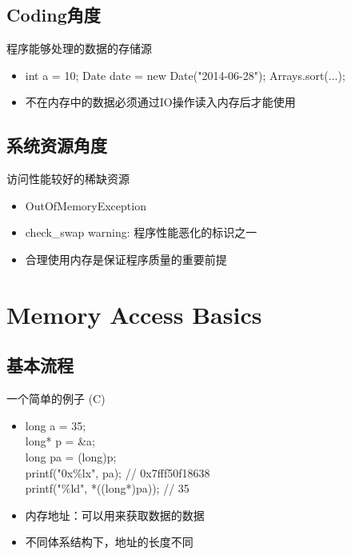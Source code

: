 \documentclass[handout]{beamer}
\begin{document}
\begin{CJK}{UTF8}{gbsn}
\subsection{Coding角度}
\begin{frame}{程序能够处理的数据的存储源}
  \begin{itemize}
  \item {
      int a = 10; Date date = new Date("2014-06-28");
      Arrays.sort(...);
      \pause
  }
  \item {
      不在内存中的数据必须通过IO操作读入内存后才能使用
  }
  \end{itemize}
\end{frame}

\subsection{系统资源角度}
\begin{frame}{访问性能较好的稀缺资源}
  \begin{itemize}
  \item {
      OutOfMemoryException
      \pause
  }
  \item {
      check\_swap warning: 程序性能恶化的标识之一
      \pause
  }
  \item {
      合理使用内存是保证程序质量的重要前提
  }
  \end{itemize}
\end{frame}

\section{Memory Access Basics}

\subsection{基本流程}

\begin{frame}{一个简单的例子 (C)}
  \begin{itemize}
  \item {
      long a = 35; \\
      long* p = \&a; \\
      long pa = (long)p; \\
      \pause
      printf("0x\%lx", pa); // 0x7fff50f18638 \\
      \pause
      printf("\%ld", *((long*)pa)); // 35
      \pause
  }
  \item {
      内存地址：可以用来获取数据的数据
  }
  \item {
      不同体系结构下，地址的长度不同
  }
  \end{itemize}
\end{frame}


\end{CJK}
\end{document}
